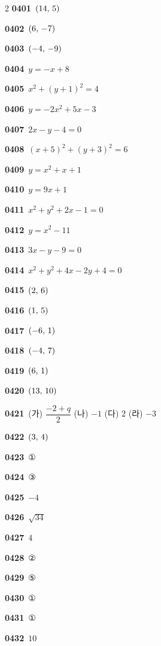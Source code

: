 \documentclass[10pt,a4paper]{article}
\begin{document}
\begin{multicols}{2}
\noindent\textbf{0401}\ $(14,\mkern3mu 5)$\par
\noindent\textbf{0402}\ $(6,\mkern3mu -7)$\par
\noindent\textbf{0403}\ $(-4,\mkern3mu -9)$\par
\noindent\textbf{0404}\ $y=-x+8$\par
\noindent\textbf{0405}\ $x^2+(y+1)^2=4$\par
\noindent\textbf{0406}\ $y=-2x^2+5x-3$\par
\noindent\textbf{0407}\ $2x-y-4=0$\par
\noindent\textbf{0408}\ $(x+5)^2+(y+3)^2=6$\par
\noindent\textbf{0409}\ $y=x^2+x+1$\par
\noindent\textbf{0410}\ $y=9x+1$\par
\noindent\textbf{0411}\ $x^2+y^2+2x-1=0$\par
\noindent\textbf{0412}\ $y=x^2-11$\par
\noindent\textbf{0413}\ $3x-y-9=0$\par
\noindent\textbf{0414}\ $x^2+y^2+4x-2y+4=0$\par
\noindent\textbf{0415}\ $(2,\mkern3mu 6)$\par
\noindent\textbf{0416}\ $(1,\mkern3mu 5)$\par
\noindent\textbf{0417}\ $(-6,\mkern3mu 1)$\par
\noindent\textbf{0418}\ $(-4,\mkern3mu 7)$\par
\noindent\textbf{0419}\ $(6,\mkern3mu 1)$\par
\noindent\textbf{0420}\ $(13,\mkern3mu 10)$\par
\noindent\textbf{0421}\ (가) $\dfrac{-2+q}{2}$ (나) $-1$ (다) $2$ (라) $-3$\par
\noindent\textbf{0422}\ $(3,\mkern3mu 4)$\par
\noindent\textbf{0423}\ ①\par
\noindent\textbf{0424}\ ③\par
\noindent\textbf{0425}\ $-4$\par
\noindent\textbf{0426}\ $\sqrt{34}$\par
\noindent\textbf{0427}\ $4$\par
\noindent\textbf{0428}\ ②\par
\noindent\textbf{0429}\ ⑤\par
\noindent\textbf{0430}\ ①\par
\noindent\textbf{0431}\ ①\par
\noindent\textbf{0432}\ $10$\par

\end{multicols}
\end{document}

